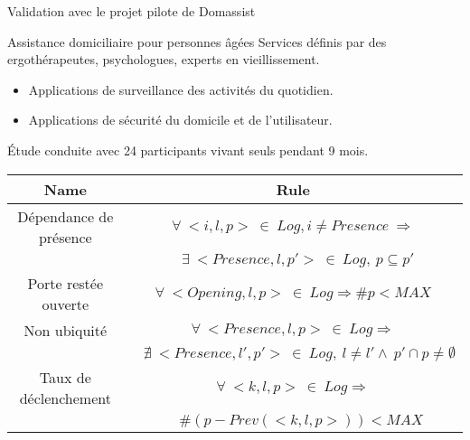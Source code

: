 \begin{frame}[fragile]{Validation avec le projet pilote de Domassist}
\begin{coloredbox}[black]{Assistance domiciliaire pour personnes âgées}
\footnotesize
  Services définis par des ergothérapeutes, psychologues, experts en vieillissement.\\%
  
  \begin{itemize}
  \item Applications de surveillance des activités du quotidien.
  \item Applications de sécurité du domicile et de l'utilisateur.
  \end{itemize}
  Étude conduite avec 24 participants vivant seuls pendant 9 mois.
\end{coloredbox}
\vfill
   \begin{table}[!h]
    \begin{scriptsize}
      \begin{tabular}{| c | c |} \hline
        {\bf Name} & {\bf Rule} \\ \hline \hline
        Dépendance de présence & 
$\forall~<i, l, p>~\in~Log, i \neq Presence~ \Rightarrow$\\
        &$~~~\exists~ <Presence, l, p'>~\in~Log,~p \subseteq p'$
\\ \hline
        Porte restée ouverte & $\forall~<Opening, l, p>~\in~Log \Rightarrow  \# p < MAX$  \\ \hline
        Non ubiquité & $\forall~<Presence, l, p>~\in~Log \Rightarrow$ \\
     &$~~~~\nexists~ <Presence, l', p'>~\in~Log,~l \neq l' \wedge ~p' \cap p \neq \emptyset$ \\ \hline
         Taux de déclenchement & $\forall~<k, l, p>~\in~Log \Rightarrow$ \\
     &$~~~~~\# (p - Prev(<k, l, p>)) < MAX$ \\ \hline
      \end{tabular}
    \end{scriptsize}
    \vspace{5mm}
    \label{scenario-fig}
  \end{table}
\end{frame}
